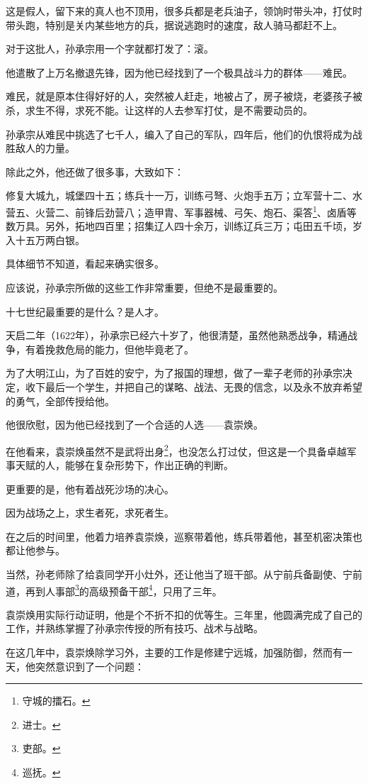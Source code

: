 \begin{multicols}{\theparacolNo}
		这是假人，留下来的真人也不顶用，很多兵都是老兵油子，领饷时带头冲，打仗时带头跑，特别是关内某些地方的兵，据说逃跑时的速度，敌人骑马都赶不上。

		对于这批人，孙承宗用一个字就都打发了：滚。

		他遣散了上万名撤退先锋，因为他已经找到了一个极具战斗力的群体——难民。

		难民，就是原本住得好好的人，突然被人赶走，地被占了，房子被烧，老婆孩子被杀，求生不得，求死不能。让这样的人去参军打仗，是不需要动员的。

		孙承宗从难民中挑选了七千人，编入了自己的军队，四年后，他们的仇恨将成为战胜敌人的力量。

		除此之外，他还做了很多事，大致如下：

		修复大城九，城堡四十五；练兵十一万，训练弓弩、火炮手五万；立军营十二、水营五、火营二、前锋后劲营八；造甲胄、军事器械、弓矢、炮石、渠答\footnote{守城的擂石。}、卤盾等数万具。另外，拓地四百里；招集辽人四十余万，训练辽兵三万；屯田五千顷，岁入十五万两白银。

		具体细节不知道，看起来确实很多。

		应该说，孙承宗所做的这些工作非常重要，但绝不是最重要的。

		十七世纪最重要的是什么？是人才。

		天启二年（1622年），孙承宗已经六十岁了，他很清楚，虽然他熟悉战争，精通战争，有着挽救危局的能力，但他毕竟老了。

		为了大明江山，为了百姓的安宁，为了报国的理想，做了一辈子老师的孙承宗决定，收下最后一个学生，并把自己的谋略、战法、无畏的信念，以及永不放弃希望的勇气，全部传授给他。

		他很欣慰，因为他已经找到了一个合适的人选——袁崇焕。

		在他看来，袁崇焕虽然不是武将出身\footnote{进士。}，也没怎么打过仗，但这是一个具备卓越军事天赋的人，能够在复杂形势下，作出正确的判断。

		更重要的是，他有着战死沙场的决心。

		因为战场之上，求生者死，求死者生。

		在之后的时间里，他着力培养袁崇焕，巡察带着他，练兵带着他，甚至机密决策也都让他参与。

		当然，孙老师除了给袁同学开小灶外，还让他当了班干部。从宁前兵备副使、宁前道，再到人事部\footnote{吏部。}的高级预备干部\footnote{巡抚。}，只用了三年。

		袁崇焕用实际行动证明，他是个不折不扣的优等生。三年里，他圆满完成了自己的工作，并熟练掌握了孙承宗传授的所有技巧、战术与战略。

		在这几年中，袁崇焕除学习外，主要的工作是修建宁远城，加强防御，然而有一天，他突然意识到了一个问题：


\end{multicols}
